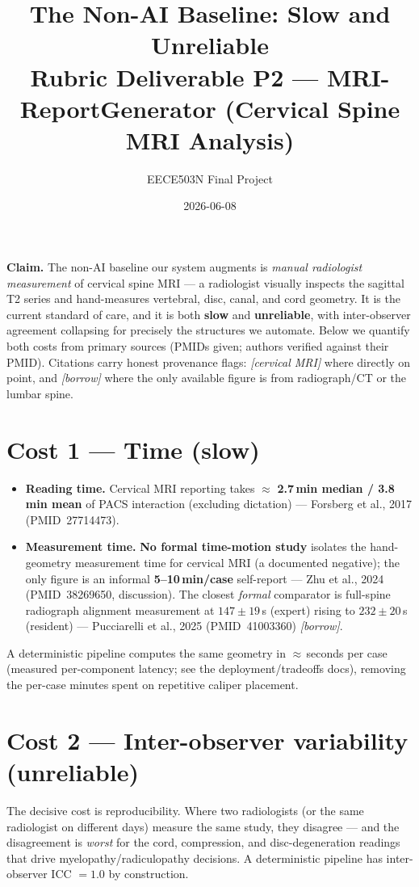 \documentclass[11pt]{article}
\title{\textbf{The Non-AI Baseline: Slow and Unreliable}\\[2pt]
\large Rubric Deliverable P2 --- MRI-ReportGenerator (Cervical Spine MRI Analysis)}
\author{EECE503N Final Project}
\date{2026-06-08}
\begin{document}
\maketitle

\noindent\textbf{Claim.} The non-AI baseline our system augments is \emph{manual radiologist
measurement} of cervical spine MRI --- a radiologist visually inspects the sagittal T2 series and
hand-measures vertebral, disc, canal, and cord geometry. It is the current standard of care, and it is
both \textbf{slow} and \textbf{unreliable}, with inter-observer agreement collapsing for precisely the
structures we automate. Below we quantify both costs from primary sources (PMIDs given; authors verified
against their PMID). Citations carry honest provenance flags: \emph{[cervical MRI]} where directly on
point, and \emph{[borrow]} where the only available figure is from radiograph/CT or the lumbar spine.

\section{Cost 1 --- Time (slow)}
\begin{itemize}
  \item \textbf{Reading time.} Cervical MRI reporting takes \(\approx\) \textbf{2.7\,min median /
  3.8\,min mean} of PACS interaction (excluding dictation) --- Forsberg et al., 2017 (PMID~27714473).
  \item \textbf{Measurement time.} \textbf{No formal time-motion study} isolates the hand-geometry
  measurement time for cervical MRI (a documented negative); the only figure is an informal
  \textbf{5--10\,min/case} self-report --- Zhu et al., 2024 (PMID~38269650, discussion). The closest
  \emph{formal} comparator is full-spine radiograph alignment measurement at
  \(147\pm19\)\,s (expert) rising to \(232\pm20\)\,s (resident) --- Pucciarelli et al., 2025
  (PMID~41003360) \emph{[borrow]}.
\end{itemize}
\noindent A deterministic pipeline computes the same geometry in \(\approx\)\,seconds per case (measured
per-component latency; see the deployment/tradeoffs docs), removing the per-case minutes spent on
repetitive caliper placement.

\section{Cost 2 --- Inter-observer variability (unreliable)}
The decisive cost is reproducibility. Where two radiologists (or the same radiologist on different days)
measure the same study, they disagree --- and the disagreement is \emph{worst} for the cord, compression,
and disc-degeneration readings that drive myelopathy/radiculopathy decisions. A deterministic pipeline has
inter-observer ICC \(=1.0\) by construction.
\end{document}
